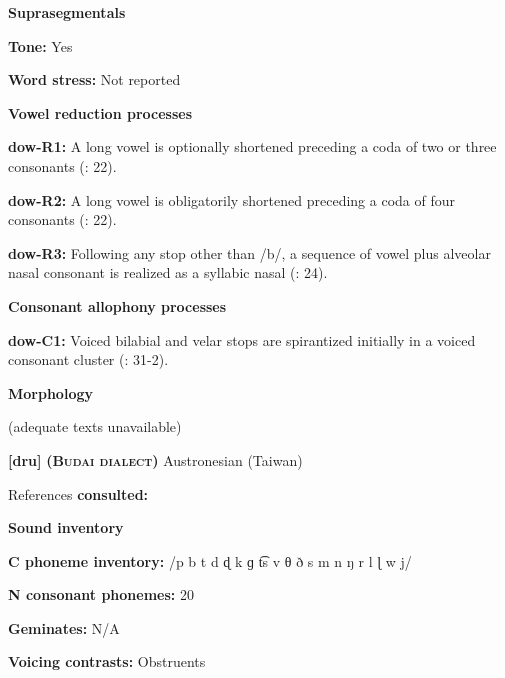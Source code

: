 \textbf{Suprasegmentals}



\textbf{Tone:} Yes



\textbf{Word stress:} Not reported



\textbf{Vowel reduction processes}



\textbf{dow-R1:} A long vowel is optionally shortened preceding a coda of two or three consonants (\citealt{WieringWiering1994}: 22).



\textbf{dow-R2:} A long vowel is obligatorily shortened preceding a coda of four consonants (\citealt{WieringWiering1994}: 22).



\textbf{dow-R3:} Following any stop other than /b/, a sequence of vowel plus alveolar nasal consonant is realized as a syllabic nasal (\citealt{WieringWiering1994}: 24).



\textbf{Consonant allophony processes}



\textbf{dow-C1:} Voiced bilabial and velar stops are spirantized initially in a voiced consonant cluster (\citealt{WieringWiering1994}: 31-2).



\textbf{Morphology}



(adequate texts unavailable)



\textbf{[dru]}   \textbf{\textsc{ (Budai dialect)}  }Austronesian (Taiwan)



References \textbf{consulted:} \citet{Chen2006}



\textbf{Sound inventory}



\textbf{C phoneme inventory:} /p b t d ɖ k ɡ t͡s v θ ð s m n ŋ r l ɭ w j/



\textbf{N consonant phonemes:} 20



\textbf{Geminates:} N/A



\textbf{Voicing contrasts:} Obstruents



